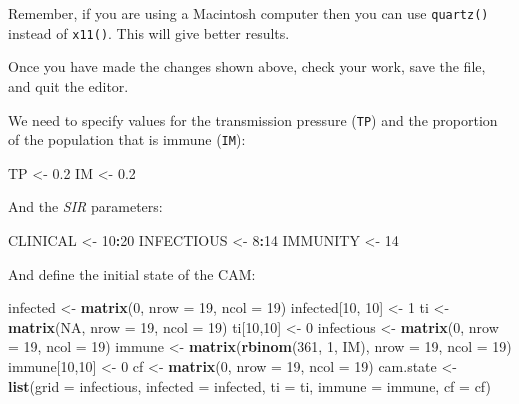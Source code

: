\documentclass[12pt,a4paper]{book}
\newenvironment{Shaded}{\begin{snugshade}}{\end{snugshade}}
\newcommand{\KeywordTok}[1]{\textcolor[rgb]{0.13,0.29,0.53}{\textbf{#1}}}
\newcommand{\DataTypeTok}[1]{\textcolor[rgb]{0.13,0.29,0.53}{#1}}
\newcommand{\DecValTok}[1]{\textcolor[rgb]{0.00,0.00,0.81}{#1}}
\newcommand{\FloatTok}[1]{\textcolor[rgb]{0.00,0.00,0.81}{#1}}
\newcommand{\StringTok}[1]{\textcolor[rgb]{0.31,0.60,0.02}{#1}}
\newcommand{\OtherTok}[1]{\textcolor[rgb]{0.56,0.35,0.01}{#1}}
\newcommand{\OperatorTok}[1]{\textcolor[rgb]{0.81,0.36,0.00}{\textbf{#1}}}
\newcommand{\NormalTok}[1]{#1}
\theoremstyle{definition}
\theoremstyle{definition}
\theoremstyle{definition}
\theoremstyle{remark}
\begin{document}
Remember, if you are using a Macintosh computer then you can use
\texttt{quartz()} instead of \texttt{x11()}. This will give better
results.

Once you have made the changes shown above, check your work, save the
file, and quit the editor.

We need to specify values for the transmission pressure (\texttt{TP})
and the proportion of the population that is immune (\texttt{IM}):

\begin{Shaded}
\begin{Highlighting}[]
\NormalTok{TP <-}\StringTok{ }\FloatTok{0.2}
\NormalTok{IM <-}\StringTok{ }\FloatTok{0.2}
\end{Highlighting}
\end{Shaded}

And the \emph{SIR} parameters:

\begin{Shaded}
\begin{Highlighting}[]
\NormalTok{CLINICAL <-}\StringTok{ }\DecValTok{10}\OperatorTok{:}\DecValTok{20}
\NormalTok{INFECTIOUS <-}\StringTok{ }\DecValTok{8}\OperatorTok{:}\DecValTok{14}
\NormalTok{IMMUNITY <-}\StringTok{ }\DecValTok{14}
\end{Highlighting}
\end{Shaded}

And define the initial state of the CAM:

\begin{Shaded}
\begin{Highlighting}[]
\NormalTok{infected <-}\StringTok{ }\KeywordTok{matrix}\NormalTok{(}\DecValTok{0}\NormalTok{, }\DataTypeTok{nrow =} \DecValTok{19}\NormalTok{, }\DataTypeTok{ncol =} \DecValTok{19}\NormalTok{)}
\NormalTok{infected[}\DecValTok{10}\NormalTok{, }\DecValTok{10}\NormalTok{] <-}\StringTok{ }\DecValTok{1}
\NormalTok{ti <-}\StringTok{ }\KeywordTok{matrix}\NormalTok{(}\OtherTok{NA}\NormalTok{, }\DataTypeTok{nrow =} \DecValTok{19}\NormalTok{, }\DataTypeTok{ncol =} \DecValTok{19}\NormalTok{)}
\NormalTok{ti[}\DecValTok{10}\NormalTok{,}\DecValTok{10}\NormalTok{] <-}\StringTok{ }\DecValTok{0}
\NormalTok{infectious <-}\StringTok{ }\KeywordTok{matrix}\NormalTok{(}\DecValTok{0}\NormalTok{, }\DataTypeTok{nrow =} \DecValTok{19}\NormalTok{, }\DataTypeTok{ncol =} \DecValTok{19}\NormalTok{)}
\NormalTok{immune <-}\StringTok{ }\KeywordTok{matrix}\NormalTok{(}\KeywordTok{rbinom}\NormalTok{(}\DecValTok{361}\NormalTok{, }\DecValTok{1}\NormalTok{, IM), }\DataTypeTok{nrow =} \DecValTok{19}\NormalTok{, }\DataTypeTok{ncol =} \DecValTok{19}\NormalTok{)}
\NormalTok{immune[}\DecValTok{10}\NormalTok{,}\DecValTok{10}\NormalTok{] <-}\StringTok{ }\DecValTok{0}
\NormalTok{cf <-}\StringTok{ }\KeywordTok{matrix}\NormalTok{(}\DecValTok{0}\NormalTok{, }\DataTypeTok{nrow =} \DecValTok{19}\NormalTok{, }\DataTypeTok{ncol =} \DecValTok{19}\NormalTok{)}
\NormalTok{cam.state <-}\StringTok{  }\KeywordTok{list}\NormalTok{(}\DataTypeTok{grid =}\NormalTok{ infectious, }\DataTypeTok{infected =}\NormalTok{ infected, }\DataTypeTok{ti =}\NormalTok{ ti,}
                   \DataTypeTok{immune =}\NormalTok{ immune, }\DataTypeTok{cf =}\NormalTok{ cf)}
\end{Highlighting}
\end{Shaded}
\end{document}
